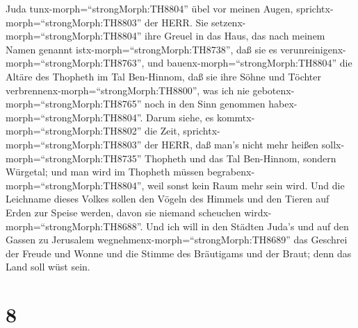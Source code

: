 Juda tunx-morph=``strongMorph:TH8804'' übel vor meinen Augen,
sprichtx-morph=``strongMorph:TH8803'' der HERR. Sie
setzenx-morph=``strongMorph:TH8804'' ihre Greuel in das Haus, das nach
meinem Namen genannt istx-morph=``strongMorph:TH8738'', daß sie es
verunreinigenx-morph=``strongMorph:TH8763'',  und
bauenx-morph=``strongMorph:TH8804'' die Altäre des Thopheth im Tal
Ben-Hinnom, daß sie ihre Söhne und Töchter
verbrennenx-morph=``strongMorph:TH8800'', was ich nie
gebotenx-morph=``strongMorph:TH8765'' noch in den Sinn genommen
habex-morph=``strongMorph:TH8804''.  Darum siehe, es
kommtx-morph=``strongMorph:TH8802'' die Zeit,
sprichtx-morph=``strongMorph:TH8803'' der HERR, daß man's nicht mehr
heißen sollx-morph=``strongMorph:TH8735'' Thopheth und das Tal
Ben-Hinnom, sondern Würgetal; und man wird im Thopheth müssen
begrabenx-morph=``strongMorph:TH8804'', weil sonst kein Raum mehr sein
wird.  Und die Leichname dieses Volkes sollen den Vögeln
des Himmels und den Tieren auf Erden zur Speise werden, davon sie
niemand scheuchen wirdx-morph=``strongMorph:TH8688''.  Und
ich will in den Städten Juda's und auf den Gassen zu Jerusalem
wegnehmenx-morph=``strongMorph:TH8689'' das Geschrei der Freude und
Wonne und die Stimme des Bräutigams und der Braut; denn das Land soll
wüst sein.

\hypertarget{section-7}{%
\section{8}\label{section-7}}


